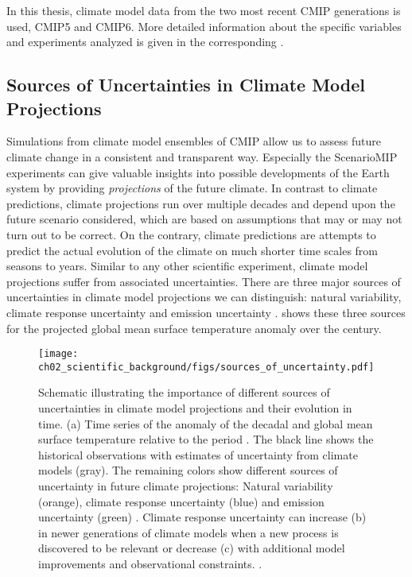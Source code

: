 In this thesis, climate model data from the two most recent \ac{CMIP}
generations is used, \acs{CMIP}5 and \acs{CMIP}6. More detailed information
about the specific variables and experiments analyzed is given in the
corresponding .


\subsection{Sources of Uncertainties in Climate Model Projections}
\label{subsec:02:source_of_uncertainties}

Simulations from climate model ensembles of \ac{CMIP} allow us to assess future
climate change in a consistent and transparent way. Especially the
\ac{ScenarioMIP} experiments can give valuable insights into possible
developments of the Earth system by providing \emph{projections} of the future
climate. In contrast to climate predictions, climate projections run over
multiple decades and depend upon the future scenario considered, which are
based on assumptions that may or may not turn out to be correct. On the
contrary, climate predictions are attempts to predict the actual evolution of
the climate on much shorter time scales from seasons to years. Similar to any
other scientific experiment, climate model projections suffer from associated
uncertainties. There are three major sources of uncertainties in climate model
projections we can distinguish: natural variability, climate response
uncertainty and emission uncertainty \autocite{Hawkins2009, Hawkins2010}.
 shows these three sources for the
projected global mean surface temperature anomaly over the  century.

\begin{figure}[t]
  \centering
  \texttt{[image: 
    ch02\_scientific\_background/figs/sources\_of\_uncertainty.pdf]}
  \caption[
    Schematic illustrating the importance of different sources of
    uncertainties in climate model projections and their evolution in time.
  ]{
    Schematic illustrating the importance of different sources of
    uncertainties in climate model projections and their evolution in time. (a)
    Time series of the anomaly of the decadal and global mean surface
    temperature relative to the period . The black line
    shows the historical observations with estimates of uncertainty from
    climate models (gray). The remaining colors show different sources of
    uncertainty in future climate projections: Natural variability (orange),
    climate response uncertainty (blue) and emission uncertainty (green)
    \autocite{Hawkins2009, Hawkins2010}. Climate response uncertainty can
    increase (b) in newer generations of climate models when a new process is
    discovered to be relevant or decrease (c) with additional model
    improvements and observational constraints.
    .
  }
  \label{fig:02:sources_of_uncertainty}
\end{figure}

